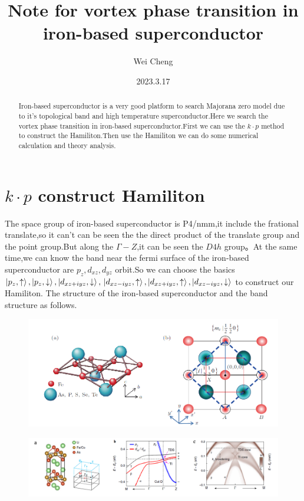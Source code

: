 \documentclass[5pt]{article}
\title{\LARGE {Note for vortex phase transition in iron-based superconductor}}
\author{\Large{Wei Cheng}}
\date{\Large{2023.3.17}}
\begin{document}
	\maketitle
	\Large
	\tableofcontents
	\everymath{\displaystyle}
	\begin{abstract}
		\Large
		Iron-based superconductor is a very good platform to search Majorana zero model due to it's topological band and high temperature superconductor.Here we search the vortex phase transition in iron-based superconductor.First we can use the $k\cdot p$ method to construct the Hamiliton.Then use the Hamiliton we can do some numerical calculation and theory analysis.
	\end{abstract}
\section{$k\cdot p$ construct Hamiliton}
The space group of iron-based superconductor is P4/nmm,it include the frational translate,so it can't can be seen the the direct product of the translate group and the point group.But along the $\Gamma-Z$,it can be seen the $D4h$ group。At the same time,we can know the band near the fermi surface of the iron-based superconductor are $p_z,d_{xz},d_{yz}$ orbit.So we can choose the basics $\ket{p_z,\uparrow},\ket{p_z,\downarrow},\ket{d_{xz+iyz},\downarrow},\\
\ket{d_{xz-iyz},\uparrow},\ket{d_{xz+iyz},\uparrow},\ket{d_{xz-iyz},\downarrow}$ to construct our Hamiliton.
The structure of the iron-based superconductor and the band structure as follows.
\begin{figure}[H]
	\centering
	\includegraphics[scale=0.8]{figure/3}
	\caption{\cite{胡江平铁基}}
	\label{}
\end{figure}

\begin{figure}[ht]
	\centering
	\includegraphics[scale=0.6]{figure/4}
	\caption{\cite{zhang2019multiple}}
	\label{}
\end{figure}
\end{document}
